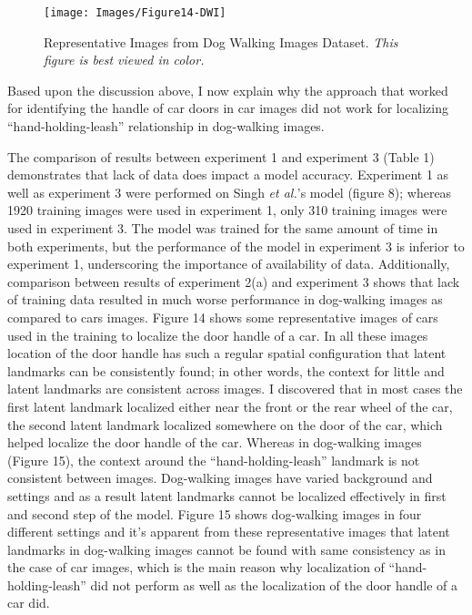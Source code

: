 \documentclass [11pt,letterpaper ,twoside ,openany ]{report}
\begin{document}
    \begin{figure}[t!]
      \centering
      \texttt{[image: Images/Figure14-DWI]}
      \caption{Representative Images from Dog Walking Images Dataset. \textit{This figure is best viewed in color.}}
      \label{fig:dwi}
    \end{figure}            

    Based upon the discussion above, I now explain why the approach that worked for identifying the handle of car doors in car images did not work for localizing ``hand-holding-leash'' relationship in dog-walking images.    

    The comparison of results between experiment 1 and experiment 3 (Table 1) demonstrates that lack of data does impact a model accuracy. Experiment 1 as well as experiment 3 were performed on Singh \textit{et al.}'s model (figure 8); whereas 1920 training images were used in experiment 1, only 310 training images were used in experiment 3. The model was trained for the same amount of time in both experiments, but the performance of the model in experiment 3 is inferior to experiment 1, underscoring the importance of availability of data. Additionally, comparison between results of experiment 2(a) and experiment 3 shows that lack of training data resulted in much worse performance in dog-walking images as compared to cars images. Figure 14 shows some representative images of cars used in the training to localize the door handle of a car. In all these images location of the door handle has such a regular spatial configuration that latent landmarks can be consistently found; in other words, the context for little and latent landmarks are consistent across images. I discovered that in most cases the first latent landmark localized either near the front or the rear wheel of the car, the second latent landmark localized somewhere on the door of the car, which helped localize the door handle of the car. Whereas in dog-walking images (Figure 15), the context around the ``hand-holding-leash'' landmark is not consistent between images. Dog-walking images have varied background and settings and as a result latent landmarks cannot be localized effectively in first and second step of the model. Figure 15 shows dog-walking images in four different settings and it's apparent from these representative images that latent landmarks in dog-walking images cannot be found with same consistency as in the case of car images, which is the main reason why localization of ``hand-holding-leash'' did not perform as well as the localization of the door handle of a car did.
\end{document}
